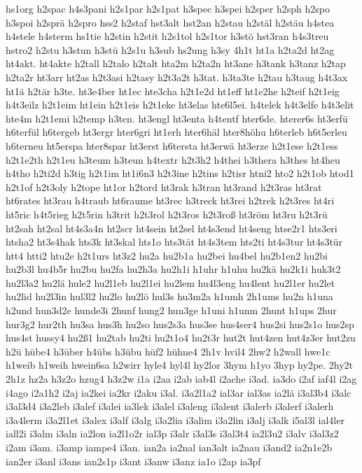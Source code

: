 {hs1org
h2spac
h4s3pani
h2s1par
h2s1pat
h3spec
h3spei
h2sper
h2sph
h2spo
h3spoi
h2sprä
h2spro
hss2
h2staf
hst3alt
hst2an
h2stau
h2stäl
h2stäu
h4stea
h4stele
h4sterm
hs1tie
h2stin
h2stit
h2s1tol
h2s1tor
h3stö
hst3ran
h4s3treu
hstro2
h2stu
h3stun
h3stü
h2s1u
h3sub
hs2ung
h3sy
4h1t
ht1a
h2ta2d
ht2ag
ht4akt.
ht4akte
h2tall
h2talo
h2talt
hta2m
h2ta2n
ht3ane
h3tank
h3tanz
h2tap
h2ta2r
ht3arr
ht2as
h2t3asi
h2tasy
h2t3a2t
h3tat.
h3ta3te
h2tau
h3taug
h4t3ax
ht1ä
h2tär
h3te.
ht3e4ber
ht1ec
hte3cha
h2t1e2d
ht1eff
ht1e2he
h2teif
h2t1eig
h4t3eilz
h2t1eim
ht1ein
h2t1eis
h2t1eke
ht3elas
hte6l5ei.
h4telek
h4t3elfe
h4t3elit
hte4m
h2t1emi
h2temp
h3ten.
ht3engl
ht3enta
h4tentf
hter6de.
hterer6s
ht3erfü
h6terfül
h6tergeb
ht3ergr
hter6gri
ht1erh
hter6häl
hter8höhu
h6terleb
h6t5erleu
h6terneu
ht5erspa
hter8spar
ht3erst
h6tersta
ht3erwä
ht3erze
h2t1ese
h2t1ess
h2t1e2th
h2t1eu
h3teum
h3teun
h4textr
h2t3h2
h4thei
h3thera
h3thes
ht4heu
h4tho
h2ti2d
h3tig
h2t1im
ht1i6n3
h2t3ine
h2tins
h2tisr
htni2
hto2
h2t1ob
htod1
h2t1of
h2t3oly
h2tope
ht1or
h2tord
ht3rak
h3tran
ht3rand
h2t3ras
ht3rat
ht6rates
ht3rau
h4traub
ht6raume
ht3rec
h3treck
ht3rei
h2trek
h2t3res
ht4ri
ht5ric
h4t5rieg
h2t5rin
h3trit
h2t3rol
h2t3ros
h2t3roß
ht3röm
ht3ru
h2t3rü
ht2sah
ht2sal
ht4s3a4n
ht2scr
ht4sein
ht2sel
ht4s3end
ht4seng
htse2r1
hts3eri
htsha2
ht3s4hak
hts3k
ht3skal
hts1o
hts3tät
ht4s3tem
hts2ti
ht4s3tur
ht4s3tür
htt4
htti2
htu2e
h2t1urs
ht3z2
hu2a
hu2b1a
hu2bei
hu4bel
hu2b1en2
hu2bi
hu2b3l
hu4b5r
hu2bu
hu2fa
hu2h3a
hu2h1i
h1uhr
h1uhu
hu2kä
hu2k1i
huk3t2
hu2l3a2
hu2lä
hule2
hu2l1eb
hu2l1ei
hu2lem
hu4l3eng
hu4lent
hu2l1er
hu2let
hu2lid
hu2l3in
hul3l2
hu2lo
hu2lö
hul3s
hu3m2a
h1umh
2h1ums
hu2n
h1una
h2und
hun3d2e
hunde3i
2hunf
hung2
hun3ge
h1uni
h1unm
2hunt
h1ups
2hur
hur3g2
hur2th
hu3sa
hus3h
hu2so
hus2s3a
hus3se
hus4ser4
hus2si
hus2s1o
hus2sp
hus4st
hussy4
hu2ß1
hu2tab
hu2ti
hu2t1o4
hu2t3r
hut2t
hut4zen
hut4z3er
hut2zu
h2ü
hübe4
h3über
h4übs
h3übu
hüf2
hühne4
2h1v
hvil4
2hw2
h2wall
hwe1c
h1weib
h1weih
hwein6sa
h2wirr
hyle4
hyl4l
hy2lor
3hym
h1yo
3hyp
hy2pe.
2hy2t
2h1z
hz2a
h3z2o
hzug4
h3z2w
i1a
i2aa
i2ab
iab4l
i2ache
i3ad.
ia3do
i2af
iaf4l
i2ag
i4ago
i2a1h2
i2aj
ia2kei
ia2kr
i2aku
i3al.
i3a2l1a2
ial3ar
ial3as
ia2lä
i3al3b4
i3alc
i3al3d4
i3a2leb
i3alef
i3alei
ia3lek
i3alel
i3aleng
i3alent
i3alerb
i3alerf
i3alerh
i3a4lerm
i3a2l1et
i3alex
i3alf
i3alg
i3a2lia
i3alim
i3a2lin
i3alj
i3alk
i5al3l
ial4ler
iall2i
i3alm
i3aln
ia2lon
ia2l1o2r
ial3p
i3alr
i3al3s
i3al3t4
ia2l3u2
i3alv
i3al3z2
i2am
i3am.
i3amp
iampe4
i3an.
ian2a
ia2nal
ian3alt
ia2nau
i3and2
ia2n1e2b
ian2er
i3anl
i3ans
ian2s1p
i3ant
i3anw
i3anz
ia1o
i2ap
ia3pf
}
